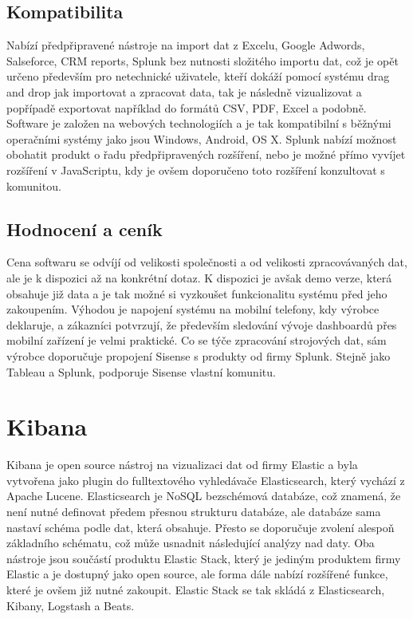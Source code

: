 \documentclass[czech,BP]{thesiskiv}
\begin{document}
\begin{itemize}
\begin{itemize}
 	\end{itemize}
 \end{itemize}
 
 \subsection{Kompatibilita}
  Nabízí předpřipravené nástroje na import dat z Excelu, Google Adwords, Salseforce, CRM reports, Splunk bez nutnosti složitého importu dat, což je opět určeno především pro netechnické uživatele, kteří dokáží pomocí systému drag and drop jak importovat a zpracovat data, tak je následně vizualizovat a popřípadě exportovat například do formátů CSV, PDF, Excel a podobně. Software je založen na webových technologiích a je tak kompatibilní s běžnými operačními systémy jako jsou Windows, Android, OS X. Splunk nabízí možnost obohatit produkt o řadu předpřipravených rozšíření, nebo je možné  přímo vyvíjet rozšíření v JavaScriptu, kdy je ovšem doporučeno toto rozšíření konzultovat s komunitou.
 \subsection{Hodnocení a ceník}
 Cena softwaru se odvíjí od  velikosti společnosti a od velikosti zpracovávaných dat, ale je k dispozici až na konkrétní dotaz. K dispozici je avšak demo verze, která obsahuje již data a je tak možné si vyzkoušet funkcionalitu systému před jeho zakoupením. Výhodou je napojení systému na mobilní telefony, kdy výrobce deklaruje, a zákazníci potvrzují, že především sledování vývoje dashboardů přes mobilní zařízení je velmi praktické. Co se týče zpracování strojových dat, sám výrobce doporučuje propojení Sisense s produkty od firmy Splunk. Stejně jako Tableau a Splunk, podporuje Sisense vlastní komunitu.
 
 
 \section{Kibana}
 Kibana je open source nástroj na vizualizaci dat od firmy Elastic a byla vytvořena jako plugin do fulltextového vyhledávače Elasticsearch, který vychází z Apache Lucene. Elasticsearch je NoSQL bezschémová databáze, což znamená, že není nutné definovat předem přesnou strukturu databáze, ale databáze sama nastaví schéma podle dat, která obsahuje. Přesto se doporučuje zvolení alespoň základního schématu, což může usnadnit následující analýzy nad daty. Oba nástroje jsou součástí produktu Elastic Stack, který je jediným produktem firmy Elastic a je dostupný jako open source, ale forma dále nabízí rozšířené funkce, které je ovšem již nutné zakoupit. Elastic Stack se tak skládá z Elasticsearch, Kibany, Logstash a Beats.
 
\end{document}

